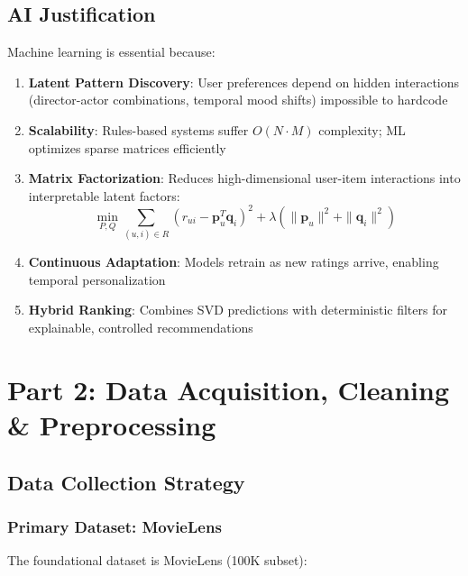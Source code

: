 \documentclass[11pt,a4paper]{article}
\begin{document}
\subsection{AI Justification}

Machine learning is essential because:

\begin{enumerate}
    \item \textbf{Latent Pattern Discovery}: User preferences depend on hidden interactions (director-actor combinations, temporal mood shifts) impossible to hardcode
    \item \textbf{Scalability}: Rules-based systems suffer $O(N \cdot M)$ complexity; ML optimizes sparse matrices efficiently
    \item \textbf{Matrix Factorization}: Reduces high-dimensional user-item interactions into interpretable latent factors:
    \begin{equation}
        \min_{P, Q} \sum_{(u,i) \in R} \left( r_{ui} - \mathbf{p}_u^T \mathbf{q}_i \right)^2 + \lambda \left( \|\mathbf{p}_u\|^2 + \|\mathbf{q}_i\|^2 \right)
    \end{equation}
    \item \textbf{Continuous Adaptation}: Models retrain as new ratings arrive, enabling temporal personalization
    \item \textbf{Hybrid Ranking}: Combines SVD predictions with deterministic filters for explainable, controlled recommendations
\end{enumerate}


\section{Part 2: Data Acquisition, Cleaning \& Preprocessing}

\subsection{Data Collection Strategy}

\subsubsection{Primary Dataset: MovieLens}

The foundational dataset is MovieLens (100K subset):
\end{document}
